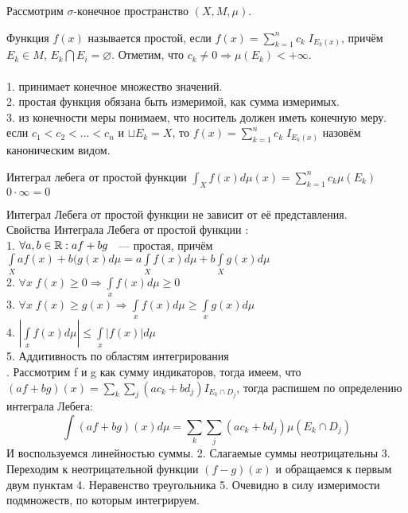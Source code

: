 Рассмотрим $\sigma$-конечное пространство $(X, M, \mu)$.

\Def Функция $f(x)$ называется простой, если $f(x) = \sum_{k = 1}^{n} c_k\; I_{E_k(x)}$, причём $E_k \in M$, $E_k \bigcap E_i = \varnothing$. Отметим, что $c_k \neq 0 \Rightarrow \mu(E_k) < +\infty$. \\

\Note \\
1. принимает конечное множество значений.\\
2. простая функция обязана быть измеримой, как сумма измеримых.\\
3. из конечности меры понимаем, что носитель должен иметь конечную меру.\\

\Note если $c_1< c_2< ... <c_n$ и $\sqcup  E_k = X$, то $f(x) = \sum_{k = 1}^{n} c_k\; I_{E_k(x)}$ назовём каноническим видом.

\Def Интеграл лебега от простой функции
$\int_{X}^{} f(x) d \mu(x) = \sum_{k = 1}^{n} c_k \mu(E_k)$ \\
\Note $0\cdot\infty = 0$

\Lemma Интеграл Лебега от простой функции не зависит от её представления.\\

Свойства Интеграла Лебега от простой функции :\\
1. $\forall a, b \in \mathbb{R}: af+bg$ ~--- простая, причём  $\int\limits_X a f(x) + b(g(x) d \mu = a  \int\limits_X  f(x) d \mu +b  \int\limits_X  g(x) d \mu $ \\
2. $\forall x \; f(x) \geq 0 \Rightarrow \int\limits_x f(x) d \mu \geq 0$ \\
3. $\forall x \; f(x) \geq g(x) \Rightarrow \int\limits_x f(x) d \mu \geq  \int\limits_x  g(x)  d \mu$ \\
4. $|\int\limits_x f(x) d \mu| \leq \int\limits_x |f(x)| d \mu$\\
5. Аддитивность по областям интегрирования\\
. Рассмотрим f и g как сумму индикаторов, тогда имеем, что $(af+bg)(x) = \sum_k \sum_j (ac_k+ bd_j) I_{E_k \cap D_j}$, тогда распишем по определению интеграла Лебега:
\[\int (af+bg)(x) d\mu = \sum_k \sum_j (ac_k+ bd_j) \mu(E_k \cap D_j)\]
И воспользуемся линейностью суммы.
2. Слагаемые суммы неотрицательны
3. Переходим к неотрицательной функции $(f-g)(x)$ и обращаемся к первым двум пунктам
4. Неравенство треугольника
5. Очевидно в силу измеримости подмножеств, по которым интегрируем.
\EndProof 

